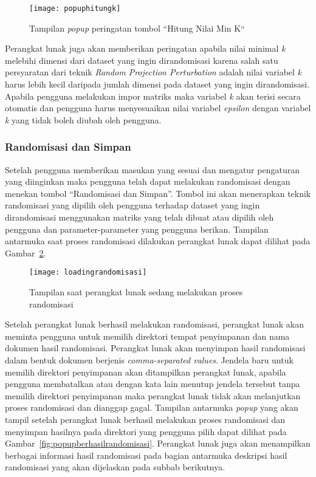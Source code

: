 \begin{figure}
	\centering
	\texttt{[image: popuphitungk]}
	\caption{Tampilan \textit{popup} peringatan tombol \textquotedblleft Hitung Nilai Min K\textquotedblleft }
	\label{fig:popuphitungk}
\end{figure}

Perangkat lunak juga akan memberikan peringatan apabila nilai minimal \textit{k} melebihi dimensi dari dataset yang ingin dirandomisasi karena salah satu persyaratan dari teknik \textit{Random Projection Perturbation} adalah nilai variabel \textit{k} harus lebih kecil daripada jumlah dimensi pada dataset yang ingin dirandomisasi. Apabila pengguna melakukan impor matriks maka variabel \textit{k} akan terisi secara otomatis dan pengguna harus menyesuaikan nilai variabel \textit{epsilon} dengan variabel \textit{k} yang tidak boleh diubah oleh pengguna. 

\subsubsection{Randomisasi dan Simpan}
\label{subsubsec:randomisasisimpan}

Setelah pengguna memberikan masukan yang sesuai dan mengatur pengaturan yang diinginkan maka pengguna telah dapat melakukan randomisasi dengan menekan tombol \textquotedblleft Randomisasi dan Simpan\textquotedblright. Tombol ini akan menerapkan teknik randomisasi yang dipilih oleh pengguna terhadap dataset yang ingin dirandomisasi menggunakan matriks yang telah dibuat atau dipilih oleh pengguna dan parameter-parameter yang pengguna berikan. Tampilan antarmuka saat proses randomisasi dilakukan perangkat lunak dapat dilihat pada Gambar~\ref{fig:loadingrandomisasi}.

\begin{figure}
	\centering
	\texttt{[image: loadingrandomisasi]}
	\caption{Tampilan saat perangkat lunak sedang melakukan proses randomisasi}
	\label{fig:loadingrandomisasi}
\end{figure}

Setelah perangkat lunak berhasil melakukan randomisasi, perangkat lunak akan meminta pengguna untuk memilih direktori tempat penyimpanan dan nama dokumen hasil randomisasi. Perangkat lunak akan menyimpan hasil randomisasi dalam bentuk dokumen berjenis \textit{comma-separated values}. Jendela baru untuk memilih direktori penyimpanan akan ditampilkan perangkat lunak, apabila pengguna membatalkan atau dengan kata lain menutup jendela tersebut tanpa memilih direktori penyimpanan maka perangkat lunak tidak akan melanjutkan proses randomisasi dan dianggap gagal. Tampilan antarmuka \textit{popup} yang akan tampil setelah perangkat lunak berhasil melakukan proses randomisasi dan menyimpan hasilnya pada direktori yang pengguna pilih dapat dilihat pada Gambar~\ref{fig:popupberhasilrandomisasi}. Perangkat lunak juga akan menampilkan berbagai informasi hasil randomisasi pada bagian antarmuka deskripsi hasil randomisasi yang akan dijelaskan pada subbab berikutnya.

